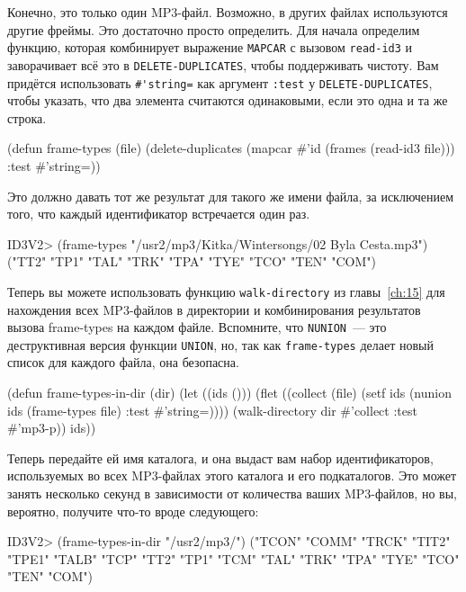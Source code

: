 Конечно, это только один MP3-файл. Возможно, в других файлах используются другие
фреймы. Это достаточно просто определить. Для начала определим функцию, которая
комбинирует выражение \lstinline{MAPCAR} с вызовом \lstinline{read-id3} и заворачивает всё это в
\lstinline{DELETE-DUPLICATES}, чтобы поддерживать чистоту. Вам придётся использовать
\lstinline!#'string=! как аргумент \lstinline{:test} у \lstinline{DELETE-DUPLICATES}, чтобы указать,
что два элемента считаются одинаковыми, если это одна и та же строка.

\begin{myverb}
(defun frame-types (file)
  (delete-duplicates (mapcar #'id (frames (read-id3 file))) :test #'string=))
\end{myverb}

Это должно давать тот же результат для такого же имени файла, за исключением того, что
каждый идентификатор встречается один раз.

\begin{myverb}
ID3V2> (frame-types "/usr2/mp3/Kitka/Wintersongs/02 Byla Cesta.mp3")
("TT2" "TP1" "TAL" "TRK" "TPA" "TYE" "TCO" "TEN" "COM")
\end{myverb}

Теперь вы можете использовать функцию \lstinline{walk-directory} из главы~\ref{ch:15} для
нахождения всех MP3-файлов в директории и комбинирования результатов вызова frame-types на
каждом файле. Вспомните, что \lstinline{NUNION}~--- это деструктивная версия функции
\lstinline{UNION}, но, так как \lstinline{frame-types} делает новый список для каждого файла, она
безопасна.

\begin{myverb}
(defun frame-types-in-dir (dir)
  (let ((ids ()))
    (flet ((collect (file)
             (setf ids (nunion ids (frame-types file) :test #'string=))))
      (walk-directory dir #'collect :test #'mp3-p))
    ids))
\end{myverb}

Теперь передайте ей имя каталога, и она выдаст вам набор идентификаторов, используемых во
всех MP3-файлах этого каталога и его подкаталогов. Это может занять несколько секунд в
зависимости от количества ваших MP3-файлов, но вы, вероятно, получите что-то вроде
следующего:

\begin{myverb}
ID3V2> (frame-types-in-dir "/usr2/mp3/")
("TCON" "COMM" "TRCK" "TIT2" "TPE1" "TALB" "TCP" "TT2" "TP1" "TCM"
 "TAL" "TRK" "TPA" "TYE" "TCO" "TEN" "COM")
\end{myverb}

